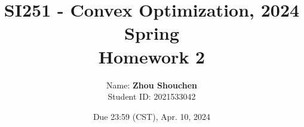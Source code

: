 \documentclass{article}
\begin{document}
\title{	SI251 - Convex Optimization, 2024 Spring\\Homework 2}
\date{Due 23:59 (CST), Apr. 10, 2024 }

\author{
    Name: \textbf{Zhou Shouchen} \\
	Student ID: 2021533042
}

\maketitle

\newpage


\begin{enumerate}




\end{enumerate}
\end{document}
